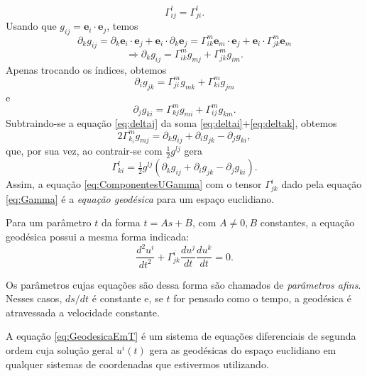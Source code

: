 \begin{equation}\label{eq:GammaSimetria}
\boxed{\Gamma_{i j}^{l}=\Gamma_{j i}^{l}} .
\end{equation}
Usando que $ g_{i j}=\mathbf{e}_{i} \cdot \mathbf{e}_{j} $, temos
\[
\partial_{k} g_{i j}=\partial_{k} \mathbf{e}_{i} \cdot \mathbf{e}_{j}+\mathbf{e}_{i} \cdot \partial_{k} \mathbf{e}_{j}=\Gamma_{i k}^{m} \mathbf{e}_{m} \cdot \mathbf{e}_{j}+\mathbf{e}_{i} \cdot \Gamma_{j k}^{m} \mathbf{e}_{m}
\]
\begin{equation}\label{eq:deltak}
\Rightarrow \partial_{k} g_{i j}=\Gamma_{i k}^{m} g_{m j}+\Gamma_{j k}^{m} g_{i m} .
\end{equation}
Apenas trocando os índices, obtemos
\begin{equation}\label{eq:deltai}
\partial_{i} g_{j k}=\Gamma_{j i}^{m} g_{m k}+\Gamma_{k i}^{m} g_{j m}
\end{equation}
e
\begin{equation}\label{eq:deltaj}
\partial_{j} g_{k i}=\Gamma_{k j}^{m} g_{m i}+\Gamma_{i j}^{m} g_{k m} .
\end{equation}
Subtraindo-se a equação \eqref{eq:deltaj} da soma \eqref{eq:deltai}+\eqref{eq:deltak}, obtemos
\[
	2 \Gamma_{k_{i}}^{m} g_{m j}=\partial_{k} g_{i j}+\partial_{i} g_{j k}-\partial_{j} g_{k i} ,
\]
que, por sua vez, ao contrair-se com $ \tfrac{1}{2} g^{l j} $ gera
\begin{equation}\label{eq:Gamma}
\boxed{
	\Gamma_{k i}^{l}=\tfrac{1}{2} g^{l j}\left(\partial_{k} g_{i j}+\partial_{i} g_{j k}-\partial_{j} g_{k i}\right) .
} 
\end{equation}
Assim, a equação \eqref{eq:ComponentesUGamma} com o tensor $ \Gamma_{jk}^i $ dado pela equação \eqref{eq:Gamma} é a \textit{equação geodésica} para um espaço euclidiano.

Para um parâmetro $ t $ da forma $ t = As+B $, com $ A\neq0,B $ constantes, a equação geodésica possui a mesma forma indicada:
\begin{equation}\label{eq:GeodesicaEmT}
\frac{d^{2} u^{i}}{d t^{2}}+\Gamma_{j k}^{i} \frac{d u^{j}}{d t} \frac{d u^{k}}{d t}=0 .
\end{equation}

Os parâmetros cujas equações são dessa forma são chamados de \textit{parâmetros afins}. Nesses casos, $ ds/dt $ é constante e, se $ t $ for pensado como o tempo, a geodésica é atravessada a velocidade constante.

A equação \eqref{eq:GeodesicaEmT} é um sistema de equações diferenciais de segunda ordem cuja solução geral $ u^i(t) $ gera as geodésicas do espaço euclidiano em qualquer sistemas de coordenadas que estivermos utilizando.

